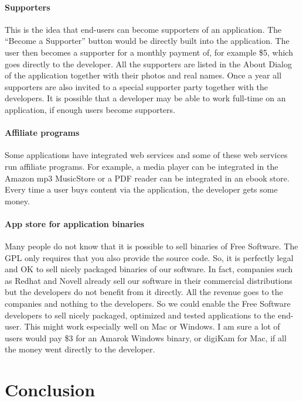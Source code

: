 \paragraph*{Supporters}

This is the idea that end-users can become supporters of an application. The
``Become a Supporter'' button would be directly built into the application. The
user then becomes a supporter for a monthly payment of, for example \$5, which
goes directly to the developer. All the supporters are listed in the About
Dialog of the application together with their photos and real names. Once a year
all supporters are also invited to a special supporter party together with the
developers. It is possible that a developer may be able to work full-time on an
application, if enough users become supporters.

\paragraph*{Affiliate programs}

Some applications have integrated web services and some of these web services
run affiliate programs. For example, a media player can be integrated in the
Amazon mp3 MusicStore or a PDF reader can be integrated in an ebook store.
Every time a user buys content via the application, the developer gets some
money.

\paragraph*{App store for application binaries}

Many people do not know that it is possible to sell binaries of Free Software.
The GPL only requires that you also provide the source code. So, it is perfectly
legal and OK to sell nicely packaged binaries of our software. In fact,
companies such as Redhat and Novell already sell our software in their commercial distributions but the developers do not benefit from it directly. All the revenue goes to the companies and nothing to the developers. So we could enable the Free Software developers to sell nicely packaged, optimized and
tested applications to the end-user. This might work especially well on Mac or
Windows. I am sure a lot of users would pay \$3 for an Amarok Windows binary, or
digiKam for Mac, if all the money went directly to the developer.

\section*{Conclusion}


